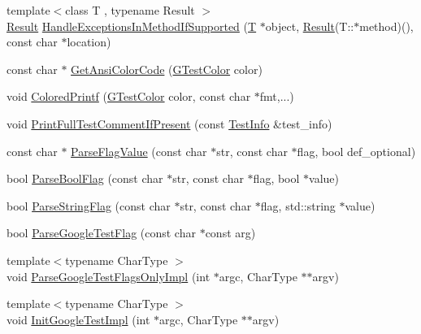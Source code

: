 \begin{DoxyCompactItemize}
{\footnotesize template$<$class T , typename Result $>$ }\\\hyperlink{typedefs__d_8js_a28287671eaf7406afd604bd055ba4066}{Result} \hyperlink{namespacetesting_1_1internal_addb2ed165b92b74e25fe9ebe9e46b9f9}{Handle\+Exceptions\+In\+Method\+If\+Supported} (\hyperlink{functions__7_8js_adf1f3edb9115acb0a1e04209b7a9937b}{T} $\ast$object, \hyperlink{typedefs__d_8js_a28287671eaf7406afd604bd055ba4066}{Result}(T\+::$\ast$method)(), const char $\ast$location)
\item 
const char $\ast$ \hyperlink{namespacetesting_1_1internal_a0aefb9deb60e90f19c236559837303d8}{Get\+Ansi\+Color\+Code} (\hyperlink{namespacetesting_1_1internal_a648c1bc94c2ef9e868ff3f9dff0f9c4e}{G\+Test\+Color} color)
\item 
void \hyperlink{namespacetesting_1_1internal_adef3055706176001364e54eb73a87e31}{Colored\+Printf} (\hyperlink{namespacetesting_1_1internal_a648c1bc94c2ef9e868ff3f9dff0f9c4e}{G\+Test\+Color} color, const char $\ast$fmt,...)
\item 
void \hyperlink{namespacetesting_1_1internal_a7a85ebe3b4de93a1edb091f92f1fb393}{Print\+Full\+Test\+Comment\+If\+Present} (const \hyperlink{classtesting_1_1_test_info}{Test\+Info} \&test\+\_\+info)
\item 
const char $\ast$ \hyperlink{namespacetesting_1_1internal_a8bfd56af5e4a89bfb76f7e1723e41b03}{Parse\+Flag\+Value} (const char $\ast$str, const char $\ast$flag, bool def\+\_\+optional)
\item 
bool \hyperlink{namespacetesting_1_1internal_ada3b98e7cfe93f4ba2053c470d9e3e51}{Parse\+Bool\+Flag} (const char $\ast$str, const char $\ast$flag, bool $\ast$value)
\item 
bool \hyperlink{namespacetesting_1_1internal_aa4ce312efaaf7a97aac2303173afe021}{Parse\+String\+Flag} (const char $\ast$str, const char $\ast$flag, std\+::string $\ast$value)
\item 
bool \hyperlink{namespacetesting_1_1internal_afccff08aa2b1ede0dd32c1364a5dee42}{Parse\+Google\+Test\+Flag} (const char $\ast$const arg)
\item 
{\footnotesize template$<$typename Char\+Type $>$ }\\void \hyperlink{namespacetesting_1_1internal_ae4c46ce8c3d016848fff52cc5133f2ac}{Parse\+Google\+Test\+Flags\+Only\+Impl} (int $\ast$argc, Char\+Type $\ast$$\ast$argv)
\item 
{\footnotesize template$<$typename Char\+Type $>$ }\\void \hyperlink{namespacetesting_1_1internal_ac3c6fa93391768aa91c6238b31aaeeb5}{Init\+Google\+Test\+Impl} (int $\ast$argc, Char\+Type $\ast$$\ast$argv)

\end{DoxyCompactItemize}
